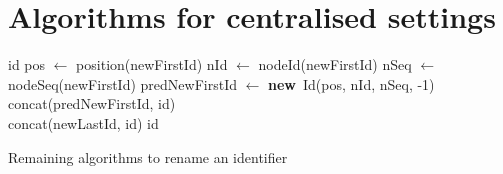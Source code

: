 \documentclass[10pt,journal,compsoc]{IEEEtran}
\let\MYoriglatexcaption\caption
\renewcommand{\caption}[2][\relax]{\MYoriglatexcaption[#2]{#2}}
\newcommand{\new}{\textbf{new}}
\begin{document}

%


\appendices
\section{Algorithms for centralised settings}

\label{app:rename-id}

\begin{myalgorithm}[h!]
    \begin{algorithmic}
            \State \Return id
        \Else
            \State pos $\gets$ position(newFirstId)
            \State nId $\gets$ nodeId(newFirstId)
            \State nSeq $\gets$ nodeSeq(newFirstId)
            \State predNewFirstId $\gets$ \new~Id(pos, nId, nSeq, -1)
            \\
            \State \Return concat(predNewFirstId, id)
            \EndIf
        \EndFunction
        \\
                \State \Return concat(newLastId, id)
            \Else
                \State \Return id
            \EndIf
        \EndFunction
    \end{algorithmic}
    \caption{Remaining algorithms to rename an identifier}
\end{myalgorithm}
\end{document}
